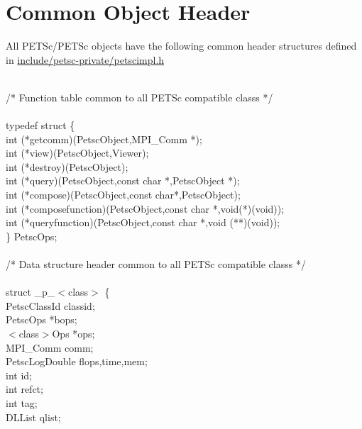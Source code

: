 \documentclass[twoside,12pt]{../sty/report_petsc}
\begin{document}
\section{Common Object Header}

All PETSc/PETSc objects have the following common header structures
defined in \href{http://www.mcs.anl.gov/petsc/petsc-dev/include/petsc-private/petscimpl.h.html}{include/petsc-private/petscimpl.h}

\begin{tabbing}
\\
/* Function table common to all PETSc compatible classs */\\
\\
typedef struct \{ \\
   int (*getcomm)(PetscObject,MPI\_Comm *);\\
   int (*view)(PetscObject,Viewer);\\
   int (*destroy)(PetscObject);\\
   int (*query)(PetscObject,const char *,PetscObject *);\\
   int (*compose)(PetscObject,const char*,PetscObject);\\
   int (*composefunction)(PetscObject,const char *,void(*)(void));\\
   int (*queryfunction)(PetscObject,const char *,void (**)(void));\\
\} PetscOps;\\
\\
/* Data structure header common to all PETSc compatible classs */\\
\\
struct \_p\_$<$class$>$ \{\\
  PetscClassId     classid;                                  \\
  PetscOps         *bops;                                   \\
  $<$class$>$Ops   *ops;                                    \\
  MPI\_Comm         comm;                                    \\
  PetscLogDouble  flops,time,mem;                          \\
  int              id;                                      \\
  int              refct;                                   \\
  int              tag;                                     \\
  DLList           qlist;                                   \\

\end{tabbing}
\end{document}
